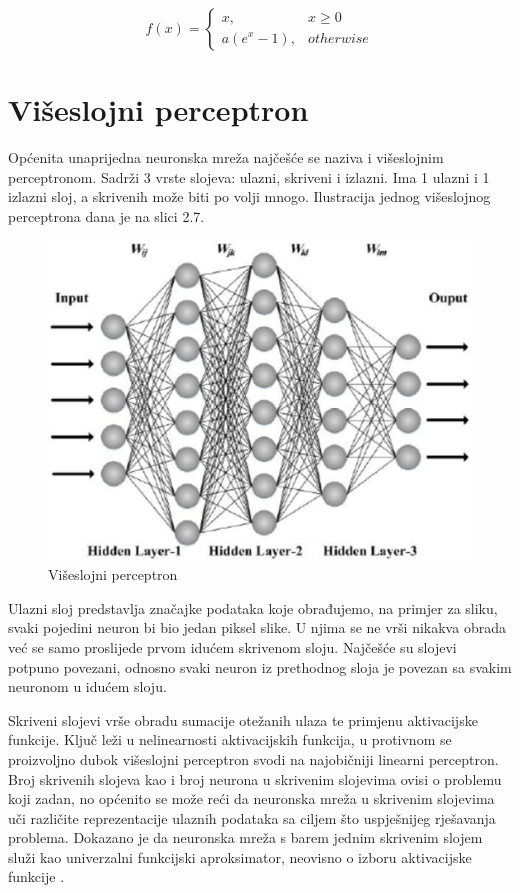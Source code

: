\documentclass[times, utf8, diplomski]{fer}
\begin{document}
\begin{equation}
    f(x)=
    \begin{cases}
      x, & x \geq 0 \\
      a(e^x - 1), & otherwise
    \end{cases}
\end{equation}

\section{Višeslojni perceptron}
Općenita unaprijedna neuronska mreža najčešće se naziva i višeslojnim perceptronom. Sadrži 3 vrste slojeva: ulazni, skriveni i izlazni. Ima 1 ulazni i 1 izlazni sloj, a skrivenih može biti po volji mnogo. Ilustracija jednog višeslojnog perceptrona dana je na slici 2.7.

\begin{figure}[htbp]
    \centering
    \includegraphics[scale=0.4]{Slike/mlp}
    \caption{Višeslojni perceptron \cite{mlp}}
\end{figure}

Ulazni sloj predstavlja značajke podataka koje obrađujemo, na primjer za sliku, svaki pojedini neuron bi bio jedan piksel slike. U njima se ne vrši nikakva obrada već se samo proslijede prvom idućem skrivenom sloju. Najčešće su slojevi potpuno povezani, odnosno svaki neuron iz prethodnog sloja je povezan sa svakim neuronom u idućem sloju. \par

Skriveni slojevi vrše obradu sumacije otežanih ulaza te primjenu aktivacijske funkcije. Ključ leži u nelinearnosti aktivacijskih funkcija, u protivnom se proizvoljno dubok višeslojni perceptron svodi na najobičniji linearni perceptron. Broj skrivenih slojeva kao i broj neurona u skrivenim slojevima ovisi o problemu koji zadan, no općenito se može reći da neuronska mreža u skrivenim slojevima uči različite reprezentacije ulaznih podataka sa ciljem što uspješnijeg rješavanja problema. Dokazano je da neuronska mreža s barem jednim skrivenim slojem služi kao univerzalni funkcijski aproksimator, neovisno o izboru aktivacijske funkcije \cite{hornik}.\par
\end{document}
